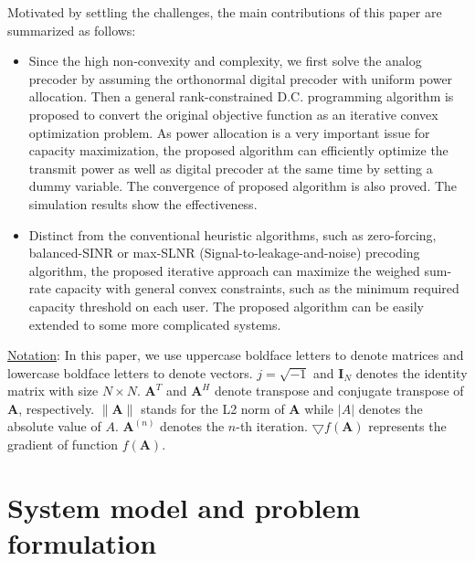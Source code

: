 \documentclass[10pt,journal,twocolumn,twoside]{IEEEtran}
\begin{document}
Motivated by settling the challenges, the main contributions of this paper are summarized as follows:

\begin{itemize}[leftmargin=*]
\item Since the high non-convexity and complexity, we first solve the analog precoder by assuming the orthonormal digital precoder with uniform power allocation. Then a general rank-constrained D.C. programming algorithm is proposed to convert the original objective function as an iterative convex optimization problem.
As power allocation is a very important issue for capacity maximization, the proposed algorithm can efficiently optimize the transmit power as well as digital precoder at the same time by setting a dummy variable. The convergence of proposed algorithm is also proved. The simulation results show the effectiveness.

\item Distinct from the conventional heuristic algorithms, such as zero-forcing, balanced-SINR or max-SLNR (Signal-to-leakage-and-noise) precoding algorithm, the proposed iterative approach can maximize the weighed sum-rate capacity with general convex constraints, such as the minimum required capacity threshold on each user. The proposed algorithm can be easily extended to some more complicated systems.

\end{itemize}


{\underline{Notation}: In this paper, we use uppercase boldface letters to denote matrices and lowercase boldface letters to denote vectors. $j = \sqrt{-1}$ and $\bm{I}_N$ denotes the identity matrix with size $N\times N$. ${\bm A}^T$ and ${\bm A}^H$ denote transpose and conjugate transpose of ${\bm A}$, respectively. $\|\bm{A}\| $ stands for the L2 norm of ${\bm A}$ while $|A|$ denotes the absolute value of $A$. $\bm{A}^{(n)}$ denotes the $n$-th iteration. $\bigtriangledown f(\bm{A})$ represents the gradient of function $f(\bm{A})$.}




\section{System model and problem formulation}\label{system}
\end{document}
